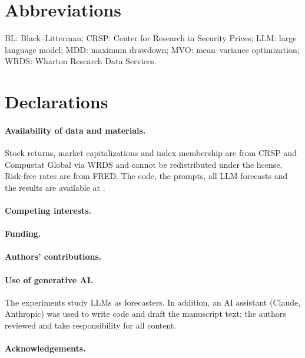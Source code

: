 \section*{Abbreviations}
BL: Black--Litterman; CRSP: Center for Research in Security Prices; LLM: large language model; MDD: maximum drawdown; MVO: mean--variance optimization; WRDS: Wharton Research Data Services.

\section*{Declarations}

\paragraph{Availability of data and materials.}
Stock returns, market capitalizations and index membership are from CRSP and Compustat Global via WRDS and cannot be redistributed under the license. Risk-free rates are from FRED. The code, the prompts, all LLM forecasts and the results are available at .

\paragraph{Competing interests.}

\paragraph{Funding.}

\paragraph{Authors' contributions.}

\paragraph{Use of generative AI.}
The experiments study LLMs as forecasters. In addition, an AI assistant (Claude, Anthropic) was used to write code and draft the manuscript text; the authors reviewed and take responsibility for all content. 

\paragraph{Acknowledgements.}
\todo{}

